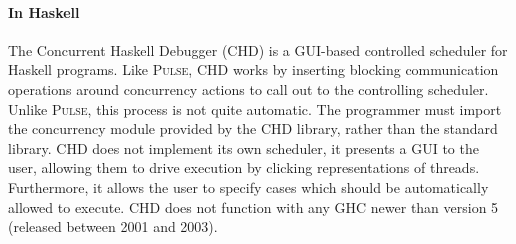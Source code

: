 \paragraph{In Haskell}
The Concurrent Haskell Debugger (CHD)\cite{bottcher2002} is a
GUI-based controlled scheduler for Haskell programs.  Like
\textsc{Pulse}, CHD works by inserting blocking communication
operations around concurrency actions to call out to the controlling
scheduler.  Unlike \textsc{Pulse}, this process is not quite
automatic.  The programmer must import the concurrency module provided
by the CHD library, rather than the standard library.  CHD does not
implement its own scheduler, it presents a GUI to the user, allowing
them to drive execution by clicking representations of threads.
Furthermore, it allows the user to specify cases which should be
automatically allowed to execute.  CHD does not function with any GHC
newer than version 5 (released between 2001 and 2003).

